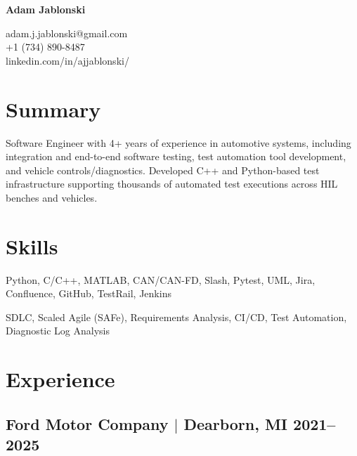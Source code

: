 \documentclass[11pt]{article}
\begin{document}
\pagestyle{empty}

\begin{center}
  \begin{minipage}{0.45\textwidth}
    {\Huge\bfseries
      Adam Jablonski
    }
  \end{minipage} \hfill
  \begin{minipage}{0.5\textwidth}
    \raggedleft
    adam.j.jablonski@gmail.com \\
    +1 (734) 890-8487 \\
    linkedin.com/in/ajjablonski/
  \end{minipage}
\end{center}

\section{Summary}
\noindent 
Software Engineer with 4+ years of experience in automotive systems, including 
integration and end-to-end software testing, test automation tool development, and vehicle 
controls/diagnostics. Developed C++ and Python-based test infrastructure supporting 
thousands of automated test executions across HIL benches and vehicles.

\section{Skills}
\begin{description}[itemsep=0pt]
  \item[Tools] Python, C/C++, MATLAB, CAN/CAN-FD, Slash, Pytest, UML, Jira, Confluence, GitHub, TestRail, Jenkins
  \item[Practices] SDLC, Scaled Agile (SAFe), Requirements Analysis, CI/CD, 
  Test Automation, Diagnostic Log Analysis
\end{description}

\section{Experience}
\subsection{Ford Motor Company $|$ {\normalfont Dearborn, MI} \hfill 2021--2025}
\end{document}
